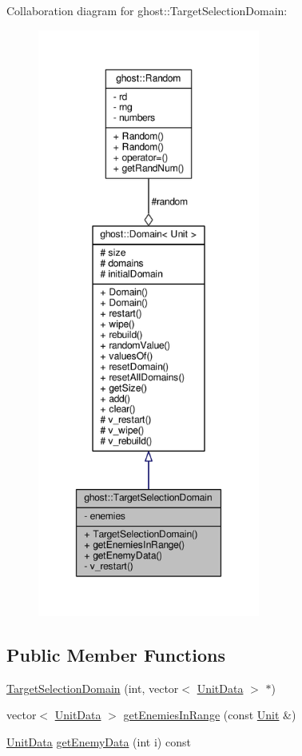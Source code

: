 Collaboration diagram for ghost\-:\-:Target\-Selection\-Domain\-:
\nopagebreak
\begin{figure}[H]
\begin{center}
\leavevmode
\includegraphics[height=550pt]{classghost_1_1TargetSelectionDomain__coll__graph}
\end{center}
\end{figure}
\subsection*{Public Member Functions}
\begin{DoxyCompactItemize}
\item 
\hyperlink{classghost_1_1TargetSelectionDomain_a827a1e0a62c38b7a8767a512c3cda816}{Target\-Selection\-Domain} (int, vector$<$ \hyperlink{structghost_1_1UnitData}{Unit\-Data} $>$ $\ast$)
\item 
vector$<$ \hyperlink{structghost_1_1UnitData}{Unit\-Data} $>$ \hyperlink{classghost_1_1TargetSelectionDomain_ac2e6c29ae1d64a3c5841a2e19c0edac2}{get\-Enemies\-In\-Range} (const \hyperlink{classghost_1_1Unit}{Unit} \&)
\item 
\hyperlink{structghost_1_1UnitData}{Unit\-Data} \hyperlink{classghost_1_1TargetSelectionDomain_af8c6b73a68cb2edde4bce3e5ee991381}{get\-Enemy\-Data} (int i) const 
\end{DoxyCompactItemize}
